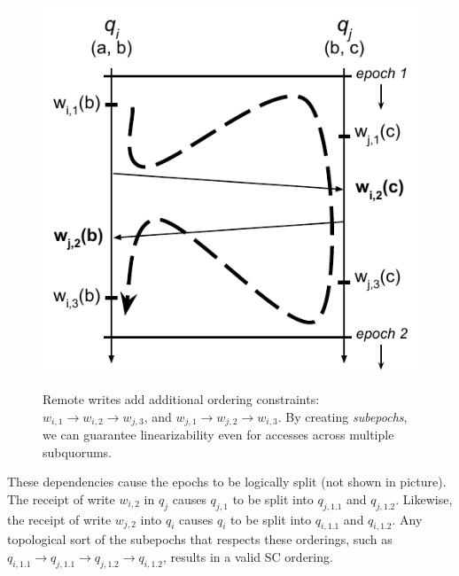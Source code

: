 \begin{figure}
    \begin{center}
        \includegraphics[width=5in]{figures/ch03_event_ordering_remote_write.pdf}
    \end{center}
    \renewcommand{\baselinestretch}{1}
    \small\normalsize

    \begin{quote}
        \caption[Event Ordering with Remote Writes in HC]{Remote writes add additional ordering constraints: $w_{i,1} \rightarrow w_{i,2}\rightarrow w_{j,3}$, and $ w_{j,1} \rightarrow w_{j,2} \rightarrow w_{i,3}$. By creating \emph{subepochs}, we can guarantee linearizability even for accesses across multiple subquorums.}
        \label{fig:ch03_event_ordering_remote_write}
    \end{quote}
\end{figure}
\renewcommand{\baselinestretch}{2}
\small\normalsize

These dependencies cause the epochs to be logically split (not shown in picture).
The receipt of write $w_{i,2}$ in $q_j$ causes $q_{j,1}$ to be split into $q_{j,1.1}$ and $q_{j,1.2}$.
Likewise, the receipt of write $w_{j,2}$ into $q_i$ causes $q_i$ to be split into $q_{i,1.1}$ and $q_{i,1.2}$.
Any topological sort of the subepochs that respects these orderings, such as $q_{i,1.1} \rightarrow q_{j,1.1} \rightarrow q_{j,1.2} \rightarrow q_{i,1.2}$, results in a valid SC ordering.

